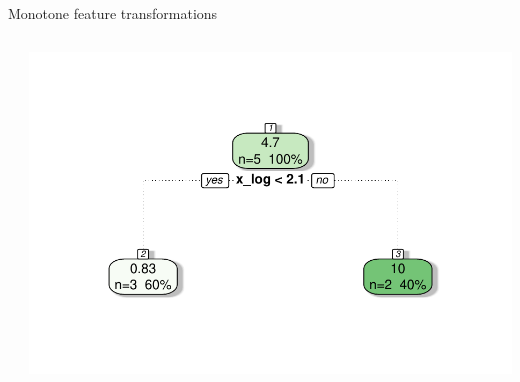 \begin{vbframe}{Monotone feature transformations}
\begin{columns}[T]
\begin{knitrout}
\end{knitrout}
\includegraphics[width = \textwidth]{figure/cart_splitcomp_2}
\end{columns}
\vspace{0.5cm}
\centering
\end{vbframe}

